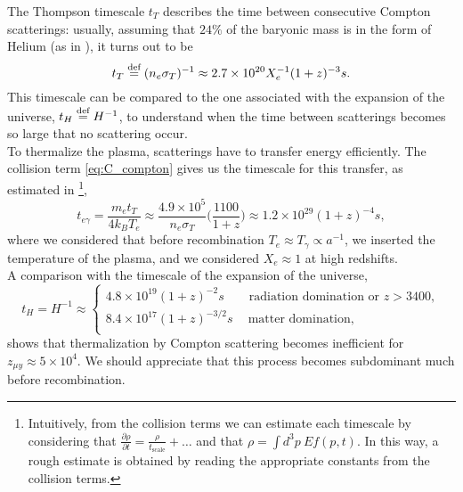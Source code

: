 The Thompson timescale $t_T$ describes the time between consecutive Compton scatterings: usually, assuming that $24\%$ of the baryonic mass is in the form of Helium (as in \cite{chlubafuturestepscosmologyusing}), it turns out to be $$t_T\stackrel{\text{def}}{=}(n_e\sigma_T)^{-1}\approx2.7\times10^{20}X_e^{-1}(1+z)^{-3}s.$$ This timescale can be compared to the one associated with the expansion of the universe, $t_H\stackrel{\text{def}}{=} H^{-1}$, to understand when the time between scatterings becomes so large that no scattering occur.\\
To thermalize the plasma, scatterings have to transfer energy efficiently. The collision term \eqref{eq:C_compton} gives us the timescale for this transfer, as estimated in \cite{chlubafuturestepscosmologyusing}\footnote{Intuitively, from the collision terms we can estimate each timescale by considering that $\frac{\partial\rho}{\partial t}=\frac{\rho}{t_\text{scale}}+\dots$ and that $\rho=\int d^3p\ Ef(p,t)$. In this way, a rough estimate is obtained by reading the appropriate constants from the collision terms.},
$$ t_{e\gamma}=\frac{m_et_T}{4k_BT_e}\approx\frac{4.9\times10^{5}}{n_e\sigma_T}\bigg(\frac{1100}{1+z}\bigg)\approx1.2\times10^{29}(1+z)^{-4}s,$$ 
where we considered that before recombination $T_e\approx T_\gamma\propto a^{-1}$, we inserted the temperature of the plasma, and we considered $X_e\approx 1$ at high redshifts.\\ A comparison with the timescale of the expansion of the universe,
$$t_H=H^{-1}\approx\begin{cases}
    4.8\times10^{19}(1+z)^{-2}s\qquad\text{radiation domination or } z>3400,\\
    8.4\times10^{17}(1+z)^{-3/2}s\quad\ \text{matter domination} ,\\
\end{cases}$$ 
shows that thermalization by Compton scattering becomes inefficient for $z_{\mu y}\approx5\times10^4$. We should appreciate that this process becomes subdominant much before recombination.

